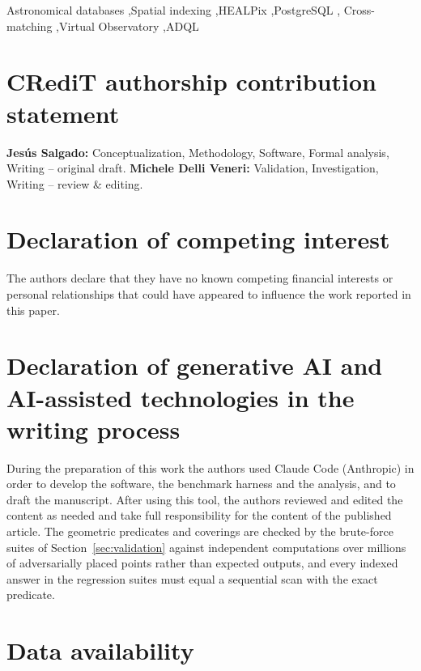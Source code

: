 \documentclass[preprint,12pt]{elsarticle}
\begin{document}
\begin{frontmatter}
\begin{keyword}
Astronomical databases \sep Spatial indexing \sep HEALPix \sep PostgreSQL \sep
Cross-matching \sep Virtual Observatory \sep ADQL
\end{keyword}

\end{frontmatter}



\section*{CRediT authorship contribution statement}

\textbf{Jes\'us Salgado:} Conceptualization, Methodology, Software, Formal analysis,
Writing -- original draft. \textbf{Michele Delli Veneri:} Validation, Investigation,
Writing -- review \& editing.

\section*{Declaration of competing interest}

The authors declare that they have no known competing financial interests or personal
relationships that could have appeared to influence the work reported in this paper.

\section*{Declaration of generative AI and AI-assisted technologies in the writing process}

During the preparation of this work the authors used Claude Code (Anthropic) in order to
develop the software, the benchmark harness and the analysis, and to draft the
manuscript. After using this tool, the authors reviewed and edited the content as needed
and take full responsibility for the content of the published article. The geometric
predicates and coverings are checked by the brute-force suites of
Section~\ref{sec:validation} against independent computations over millions of
adversarially placed points rather than expected outputs, and every indexed answer in the
regression suites must equal a sequential scan with the exact predicate.

\section*{Data availability}
\end{document}
